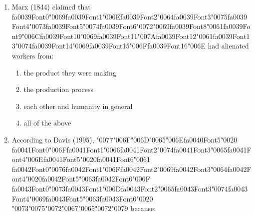\documentclass[12pt]{article}
\begin{document}
\begin{enumerate}[label=\arabic*.]
\begin{enumerate}[label=(\alph*)]
    \item Prime Minister, Archbishop of York, Viscounts of England
    \item Marquesses of England, Earls of Great Britain, King's Brothers
    \item Esquires, Serjeants of Law, Dukes' Eldest Sons
    \item King's Grandsons, Lord High Treasurer, Companions of the Bath
\end{enumerate}
\item Marx (1844) claimed that {\csname fa0039Font0\endcsname\char"0069}{\csname fa0039Font1\endcsname\char"006E}{\csname fa0039Font2\endcsname\char"0064}{\csname fa0039Font3\endcsname\char"0075}{\csname fa0039Font4\endcsname\char"0073}{\csname fa0039Font5\endcsname\char"0074}{\csname fa0039Font6\endcsname\char"0072}{\char"0069}{\csname fa0039Font8\endcsname\char"0061}{\csname fa0039Font9\endcsname\char"006C}{\csname fa0039Font10\endcsname\char"0069}{\csname fa0039Font11\endcsname\char"007A}{\csname fa0039Font12\endcsname\char"0061}{\csname fa0039Font13\endcsname\char"0074}{\csname fa0039Font14\endcsname\char"0069}{\csname fa0039Font15\endcsname\char"006F}{\csname fa0039Font16\endcsname\char"006E} had alienated workers from:
\begin{enumerate}[label=(\alph*)]
    \item the product they were making
    \item the production process
    \item each other and humanity in general
    \item all of the above
\end{enumerate}
\item According to Davis (1995), {\char"0077}{\char"006F}{\char"006D}{\char"0065}{\char"006E}{\csname fa0040Font5\endcsname\char"0020} {\csname fa0041Font0\endcsname\char"006F}{\csname fa0041Font1\endcsname\char"0066}{\csname fa0041Font2\endcsname\char"0074}{\csname fa0041Font3\endcsname\char"0065}{\csname fa0041Font4\endcsname\char"006E}{\csname fa0041Font5\endcsname\char"0020}{\csname fa0041Font6\endcsname\char"0061} {\csname fa0042Font0\endcsname\char"0076}{\csname fa0042Font1\endcsname\char"006F}{\csname fa0042Font2\endcsname\char"0069}{\csname fa0042Font3\endcsname\char"0064}{\csname fa0042Font4\endcsname\char"0020}{\csname fa0042Font5\endcsname\char"0063}{\csname fa0042Font6\endcsname\char"006F} {\csname fa0043Font0\endcsname\char"0073}{\csname fa0043Font1\endcsname\char"006D}{\csname fa0043Font2\endcsname\char"0065}{\csname fa0043Font3\endcsname\char"0074}{\csname fa0043Font4\endcsname\char"0069}{\csname fa0043Font5\endcsname\char"0063}{\csname fa0043Font6\endcsname\char"0020} {\char"0073}{\char"0075}{\char"0072}{\char"0067}{\char"0065}{\char"0072}{\char"0079} because:

\end{enumerate}
\end{document}
